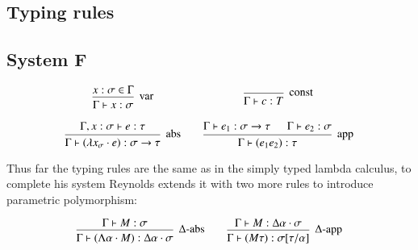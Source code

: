 \begin{appendices}

\section {Typing rules}

\subsection {System F}
\label{appendix:sysFrules}
\[\begin{array}{c@{\qquad}c}
    \mbox{\begin {prooftree}
      \hypo{x:\sigma \in \Gamma}
      \infer1[var]{\Gamma \vdash x:\sigma}
    \end {prooftree}}
    &
    \mbox{\begin{prooftree}
      \infer0[const]{\Gamma \vdash c:T}
    \end{prooftree}}
    \\\\
    \mbox{\begin{prooftree}
      \hypo{\Gamma, x:\sigma \vdash e : \tau}
      \infer1[abs]{\Gamma \vdash (\lambda x_\sigma \cdot e) : \sigma
        \to \tau}
    \end{prooftree}}
    &
    \mbox{\begin{prooftree}
      \hypo{\Gamma \vdash e_1 : \sigma \to \tau}
      \hypo{\Gamma \vdash e_2 : \sigma}
      \infer2[app]{\Gamma \vdash (e_1 e_2): \tau}
    \end{prooftree}}
    \\
\end{array} \]

Thus far the typing rules are the same as in the simply typed lambda
calculus, to complete his system Reynolds extends it with two more
rules to introduce parametric polymorphism:

\[\begin{array}{c@{\qquad}c}  
    \mbox{\begin{prooftree}
      \hypo{\Gamma \vdash M : \sigma}
      \infer1[$\Delta$-abs]{\Gamma \vdash (\Lambda \alpha \cdot M) : \Delta
      \alpha \cdot \sigma}
    \end{prooftree}}
    &
    \mbox{\begin{prooftree}
      \hypo{\Gamma \vdash M : \Delta \alpha \cdot \sigma}
      \infer1[$\Delta$-app]{\Gamma \vdash (M \tau) : \sigma[\tau / \alpha]}
    \end{prooftree}}
    \\\\
  \end{array} \]


\end{appendices}
